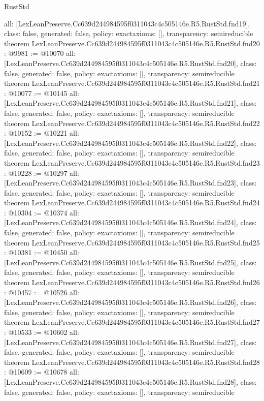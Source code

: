 \begin{lexlean}{RustStd}
\begin{coremodule}
{  all: [LexLeanPreserve.Cc639d244984595f0311043c4c505146e.R5.RustStd.fnd19],
  class: false,
  generated: false,
  policy: exact{axioms: []},
  transparency: semireducible
}
theorem LexLeanPreserve.Cc639d244984595f0311043c4c505146e.R5.RustStd.fnd20 : @9981 := @10070 {
  all: [LexLeanPreserve.Cc639d244984595f0311043c4c505146e.R5.RustStd.fnd20],
  class: false,
  generated: false,
  policy: exact{axioms: []},
  transparency: semireducible
}
theorem LexLeanPreserve.Cc639d244984595f0311043c4c505146e.R5.RustStd.fnd21 : @10077 := @10145 {
  all: [LexLeanPreserve.Cc639d244984595f0311043c4c505146e.R5.RustStd.fnd21],
  class: false,
  generated: false,
  policy: exact{axioms: []},
  transparency: semireducible
}
theorem LexLeanPreserve.Cc639d244984595f0311043c4c505146e.R5.RustStd.fnd22 : @10152 := @10221 {
  all: [LexLeanPreserve.Cc639d244984595f0311043c4c505146e.R5.RustStd.fnd22],
  class: false,
  generated: false,
  policy: exact{axioms: []},
  transparency: semireducible
}
theorem LexLeanPreserve.Cc639d244984595f0311043c4c505146e.R5.RustStd.fnd23 : @10228 := @10297 {
  all: [LexLeanPreserve.Cc639d244984595f0311043c4c505146e.R5.RustStd.fnd23],
  class: false,
  generated: false,
  policy: exact{axioms: []},
  transparency: semireducible
}
theorem LexLeanPreserve.Cc639d244984595f0311043c4c505146e.R5.RustStd.fnd24 : @10304 := @10374 {
  all: [LexLeanPreserve.Cc639d244984595f0311043c4c505146e.R5.RustStd.fnd24],
  class: false,
  generated: false,
  policy: exact{axioms: []},
  transparency: semireducible
}
theorem LexLeanPreserve.Cc639d244984595f0311043c4c505146e.R5.RustStd.fnd25 : @10381 := @10450 {
  all: [LexLeanPreserve.Cc639d244984595f0311043c4c505146e.R5.RustStd.fnd25],
  class: false,
  generated: false,
  policy: exact{axioms: []},
  transparency: semireducible
}
theorem LexLeanPreserve.Cc639d244984595f0311043c4c505146e.R5.RustStd.fnd26 : @10457 := @10526 {
  all: [LexLeanPreserve.Cc639d244984595f0311043c4c505146e.R5.RustStd.fnd26],
  class: false,
  generated: false,
  policy: exact{axioms: []},
  transparency: semireducible
}
theorem LexLeanPreserve.Cc639d244984595f0311043c4c505146e.R5.RustStd.fnd27 : @10533 := @10602 {
  all: [LexLeanPreserve.Cc639d244984595f0311043c4c505146e.R5.RustStd.fnd27],
  class: false,
  generated: false,
  policy: exact{axioms: []},
  transparency: semireducible
}
theorem LexLeanPreserve.Cc639d244984595f0311043c4c505146e.R5.RustStd.fnd28 : @10609 := @10678 {
  all: [LexLeanPreserve.Cc639d244984595f0311043c4c505146e.R5.RustStd.fnd28],
  class: false,
  generated: false,
  policy: exact{axioms: []},
  transparency: semireducible
}
\end{coremodule}
\end{lexlean}
